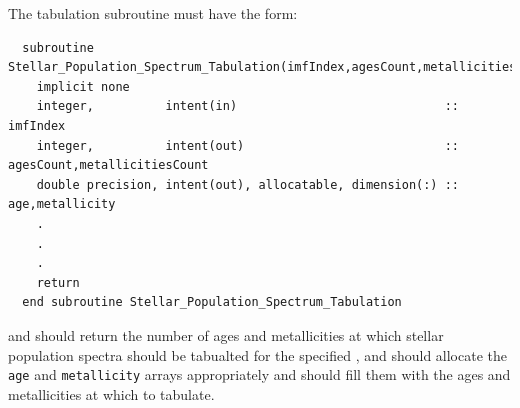 The tabulation subroutine must have the form:
\begin{verbatim}
  subroutine Stellar_Population_Spectrum_Tabulation(imfIndex,agesCount,metallicitiesCount,age,metallicity)
    implicit none
    integer,          intent(in)                             :: imfIndex
    integer,          intent(out)                            :: agesCount,metallicitiesCount
    double precision, intent(out), allocatable, dimension(:) :: age,metallicity
    .
    .
    .
    return
  end subroutine Stellar_Population_Spectrum_Tabulation
\end{verbatim}
and should return the number of ages and metallicities at which stellar population spectra should be tabualted for the specified \IMF, and should allocate the {\tt age} and {\tt metallicity} arrays appropriately and should fill them with the ages and metallicities at which to tabulate.

